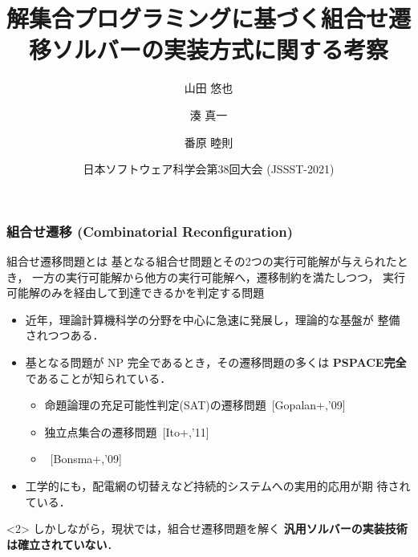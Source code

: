\documentclass[dvipdfmx,11pt]{beamer}
\title{解集合プログラミングに基づく組合せ遷移ソルバーの実装方式に関する考察}
\author{山田 悠也\inst{1} \and 湊 真一\inst{2} \and 番原 睦則\inst{1}}
\date{日本ソフトウェア科学会第38回大会 (JSSST-2021)}
\institute{\inst{1}名古屋大学 大学院情報学研究科 \and \inst{2}京都大学 大学院情報学研究科}
\begin{document}
\maketitle


\begin{frame}
  \frametitle{組合せ遷移 (Combinatorial Reconfiguration)}
  \begin{alertblock}{組合せ遷移問題とは}
    基となる組合せ問題とその2つの実行可能解が与えられたとき，
    一方の実行可能解から他方の実行可能解へ，遷移制約を満たしつつ，
    実行可能解のみを経由して到達できるかを判定する問題
  \end{alertblock}

  \begin{itemize}
  \item 近年，理論計算機科学の分野を中心に急速に発展し，理論的な基盤が
    整備されつつある\footnotemark[1]．
  \item 基となる問題が NP 完全であるとき，その遷移問題の多くは
    \alert{\bf PSPACE完全}であることが知られている．
    \begin{itemize}
    \item 命題論理の充足可能性判定(SAT)の遷移問題~[Gopalan+,'09]
    \item 独立点集合の遷移問題~[Ito+,'11]
    \item {}~[Bonsma+,'09]
    \end{itemize}
  \item 工学的にも，配電網の切替えなど持続的システムへの実用的応用が期
    待されている．
  \end{itemize}

  \begin{alertblock}<2>{}\centering
    しかしながら，現状では，組合せ遷移問題を解く
    \alert{\bf 汎用ソルバーの実装技術は確立されていない}．
  \end{alertblock}

\end{frame}
\end{document}

